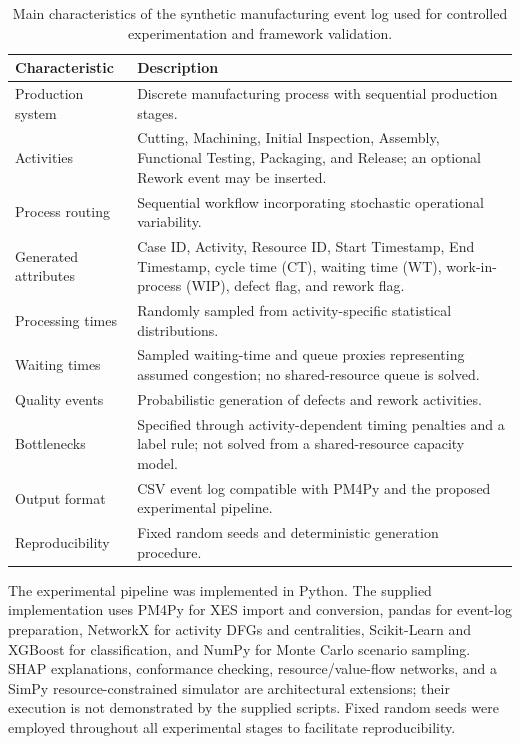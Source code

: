 \documentclass[pdflatex,iicol,Numbered,sn-basic]{sn-jnl}
\begin{document}
\begin{table}[t]
\caption{
Main characteristics of the synthetic manufacturing event log used for controlled experimentation and framework validation.
}
\label{tab:synthetic_dataset}
\centering
\begin{tabularx}{\textwidth}{p{4cm}X}
\toprule
\textbf{Characteristic} & \textbf{Description} \\
\midrule

Production system
&
Discrete manufacturing process with sequential production stages.
\\

Activities
&
Cutting, Machining, Initial Inspection, Assembly, Functional Testing, Packaging, and Release; an optional Rework event may be inserted.
\\

Process routing
&
Sequential workflow incorporating stochastic operational variability.
\\

Generated attributes
&
Case ID, Activity, Resource ID, Start Timestamp, End Timestamp, cycle time (CT), waiting time (WT), work-in-process (WIP), defect flag, and rework flag.
\\

Processing times
&
Randomly sampled from activity-specific statistical distributions.
\\

Waiting times
&
Sampled waiting-time and queue proxies representing assumed congestion; no shared-resource queue is solved.
\\

Quality events
&
Probabilistic generation of defects and rework activities.
\\

Bottlenecks
&
Specified through activity-dependent timing penalties and a label rule; not solved from a shared-resource capacity model.
\\

Output format
&
CSV event log compatible with PM4Py and the proposed experimental pipeline.
\\

Reproducibility
&
Fixed random seeds and deterministic generation procedure.
\\

\bottomrule
\end{tabularx}
\end{table}

The experimental pipeline was implemented in Python. The supplied implementation uses PM4Py for XES import and conversion, pandas for event-log preparation, NetworkX for activity DFGs and centralities, Scikit-Learn and XGBoost for classification, and NumPy for Monte Carlo scenario sampling. SHAP explanations, conformance checking, resource/value-flow networks, and a SimPy resource-constrained simulator are architectural extensions; their execution is not demonstrated by the supplied scripts. Fixed random seeds were employed throughout all experimental stages to facilitate reproducibility.
\end{document}
